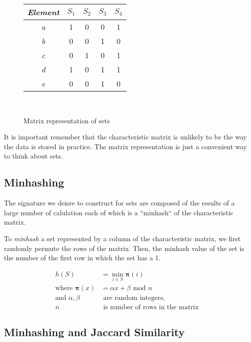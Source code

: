 \begin{figure}[H]
\centering
\begin{tabular}{|c|c|c|c|c|}
  \hline
  \textit{Element} & $S_1$ & $S_2$ & $S_3$ & $S_4$\\
  \hline
  \textit{a} & 1 & 0 & 0 & 1  \\
  \textit{b} & 0 & 0 & 1 & 0  \\
  \textit{c} & 0 & 1 & 0 & 1  \\
  \textit{d} & 1 & 0 & 1 & 1  \\
  \textit{e} & 0 & 0 & 1 & 0  \\
  \hline
\end{tabular}
\captionsetup{justification=centering}\\
\caption{Matrix representation of sets}
\label{fig:matrix-representation-of-sets}
\end{figure}

It is important remember that the characteristic matrix is unlikely to be the way the data is stored in practice. The matrix representation is just a convenient way to think about sets.

\subsection{Minhashing}\label{subsec:minhashing}

The signature we deisre to construct for sets are composed of the results of a large number of calulation each of which is a ``minhash`` of the characteristic matrix. 

To \textit{minhash} a set represented by a column of the characteristic matrix, we first randomly permute the rows of the matrix. Then, the minhash value of the set is the number of the first row in which the set has a 1. 

\begin{equation*}
    \begin{split}
        h(S) &= \min_{i \in S} \boldsymbol{\pi}(i)\\
        \text{where } \boldsymbol{\pi}(x) &= \alpha x + \beta \text{ mod } n\\ 
        \text{and } \alpha, \beta &\text{ are random integers,}\\
        n & \text{ is number of rows in the matrix}
    \end{split}
\end{equation*}

\subsection{Minhashing and Jaccard Similarity}\label{subsec:minhashing-and-jaccard-similarity}

